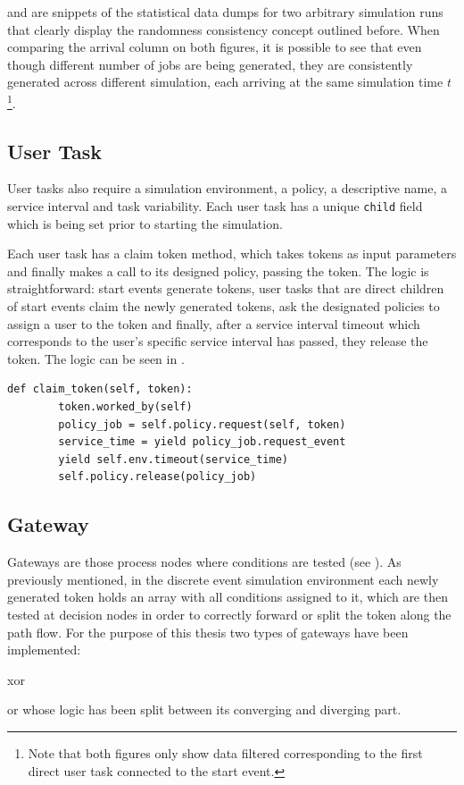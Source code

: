  and  are snippets of the statistical data dumps for two arbitrary simulation runs that clearly display the randomness consistency concept outlined before. When comparing the arrival column on both figures, it is possible to see that even though different number of jobs are being generated, they are consistently generated across different simulation, each arriving at the same simulation time $t$\footnote{Note that both figures only show data filtered corresponding to the first direct user task connected to the start event.}.

\subsection{User Task}
\label{subsec:user_task}

User tasks also require a simulation environment, a policy, a descriptive name, a service interval and task variability. Each user task has a unique \texttt{child} field which is being set prior to starting the simulation.

Each user task has a claim token method, which takes tokens as input parameters and finally makes a call to its designed policy, passing the token. The logic is straightforward: start events generate tokens, user tasks that are direct children of start events claim the newly generated tokens, ask the designated policies to assign a user to the token and finally, after a service interval timeout which corresponds to the user's specific service interval has passed, they release the token. The logic can be seen in .

\begin{lstlisting}[caption=User task claim method,label=lst:user_task,style=CustomPython]
    def claim_token(self, token):
        token.worked_by(self)
        policy_job = self.policy.request(self, token)
        service_time = yield policy_job.request_event
        yield self.env.timeout(service_time)
        self.policy.release(policy_job)
\end{lstlisting}

\subsection{Gateway}

Gateways are those process nodes where conditions are tested (see ). As previously mentioned, in the discrete event simulation environment each newly generated token holds an array with all conditions assigned to it, which are then tested at decision nodes in order to correctly forward or split the token along the path flow. For the purpose of this thesis two types of gateways have been implemented:
\begin{enumerate*}
     \item \gls{xor}
     \item \gls{or} whose logic has been split between its converging and diverging part.
 \end{enumerate*} 

